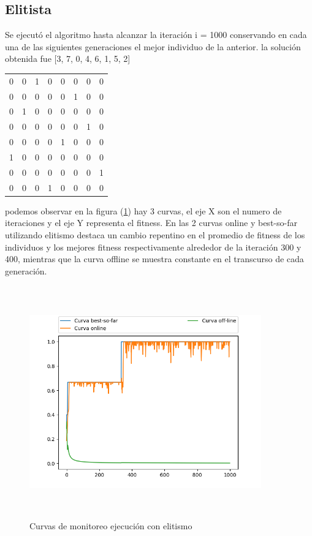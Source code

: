 \documentclass[11pt]{article}
\begin{document}
\subsection{Elitista}
Se ejecut\'o el algoritmo hasta alcanzar la iteraci\'on i = 1000  conservando en cada una de las siguientes
generaciones el mejor individuo de la anterior.
la soluci\'on obtenida fue [3, 7, 0, 4, 6, 1, 5, 2]
\begin{center}
\begin{tabular}{ c c c c c c c c }
	0 & 0 & 1 & 0 & 0 & 0 & 0 & 0\\
	0 & 0 & 0 & 0 & 0 & 1 & 0 & 0\\
	0 & 1 & 0 & 0 & 0 & 0 & 0 & 0\\
	0 & 0 & 0 & 0 & 0 & 0 & 1 & 0\\
	0 & 0 & 0 & 0 & 1 & 0 & 0 & 0\\
	1 & 0 & 0 & 0 & 0 & 0 & 0 & 0\\
	0 & 0 & 0 & 0 & 0 & 0 & 0 & 1\\
	0 & 0 & 0 & 1 & 0 & 0 & 0 & 0
\end{tabular}
\end{center}
podemos observar en la figura (\ref{elitismo}) hay 3 curvas, el eje X son el numero de iteraciones y el eje Y representa el fitness. En las 2 curvas online y best-so-far utilizando elitismo destaca un cambio repentino en el promedio de fitness de los individuos y los mejores fitness respectivamente alrededor de la iteraci\'on 300 y 400, mientras que la curva offline se muestra constante en el transcurso de cada generaci\'on.
\begin{figure}[t]
    \includegraphics[width=10cm, height=10cm]{Figure_1}
    \centering
    \caption{Curvas de monitoreo ejecuci\'on con elitismo}
    \label{elitismo}
    \end{figure}
\end{document}
